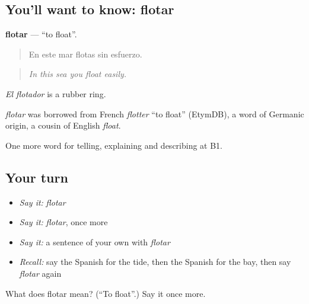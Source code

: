 \subsection*{You'll want to know: flotar}
\textbf{flotar} — \textquotedblleft{}to float\textquotedblright{}.

\begin{quote}
En este mar flotas sin esfuerzo.
\end{quote}

\begin{quote}
\emph{In this sea you float easily.}
\end{quote}

\emph{El flotador} is a rubber ring.

\begin{cousinweb}
\emph{flotar} was borrowed from French \emph{flotter} \textquotedblleft{}to float\textquotedblright{} (EtymDB), a word of Germanic origin, a cousin of English \emph{float}.
\end{cousinweb}

\begin{grammarlens}[title={What you've built}]
One more word for telling, explaining and describing at B1.
\end{grammarlens}

\subsection*{Your turn}
\begin{itemize}
\raggedright
  \item \emph{Say it:} \emph{flotar}
  \item \emph{Say it:} \emph{flotar}, once more
  \item \emph{Say it:} a sentence of your own with \emph{flotar}
  \item \emph{Recall:} say the Spanish for the tide, then the Spanish for the bay, then say \emph{flotar} again
\end{itemize}

\begin{tcolorbox}[breakable,colback=teal!4,colframe=teal!35!black,title={Before you move on}]
What does flotar mean? (\textquotedblleft{}To float\textquotedblright{}.) Say it once more.
\end{tcolorbox}
